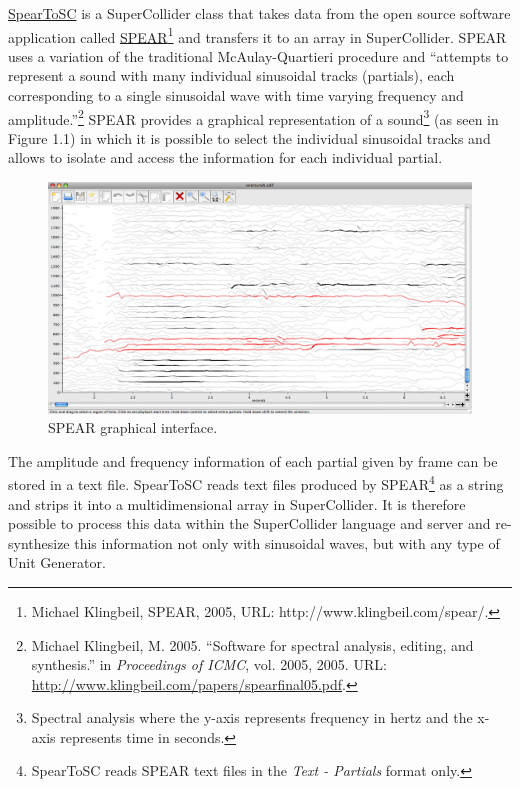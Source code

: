 \href{http://github.com/freuben/FedeLib/blob/master/SpearToSC/SpearToSC.sc}{SpearToSC} is a SuperCollider class that takes data from the open source software application called  \href{http://www.klingbeil.com/spear/}{SPEAR}\footnote{Michael Klingbeil, SPEAR, 2005, URL: http://www.klingbeil.com/spear/.} and transfers it to an array in SuperCollider. SPEAR uses a variation of the traditional McAulay-Quartieri procedure and ``attempts to represent a sound with many individual sinusoidal tracks (partials), each corresponding to a single sinusoidal wave with time varying frequency and amplitude.''\footnote{Michael Klingbeil, M. 2005. ``Software for spectral analysis, editing, and synthesis.'' in \emph{Proceedings of ICMC}, vol. 2005, 2005. URL: \href{http://www.klingbeil.com/papers/spearfinal05.pdf}{http://www.klingbeil.com/papers/spearfinal05.pdf}.} SPEAR provides a graphical representation of a sound\footnote{Spectral analysis where the y-axis represents frequency in hertz and the x-axis represents time in seconds.} (as seen in Figure 1.1) in which it is possible to select the individual sinusoidal tracks and allows to isolate and access the information for each individual partial. 
\begin{figure}[htbp] %
   \centering
   \includegraphics[width=15cm]{Chapter4/Spear1.tif} %
   \caption{SPEAR graphical interface.}
   \label{fig:example}
\end{figure}
The amplitude and frequency information of each partial given by frame can be stored in a text file. SpearToSC reads text files produced by SPEAR\footnote{SpearToSC reads SPEAR text files in the \emph{Text - Partials} format only.} as a string and strips it into a multidimensional array in SuperCollider. It is therefore possible to process this data within the SuperCollider language and server and re-synthesize this information not only with sinusoidal waves, but with any type of Unit Generator. 


